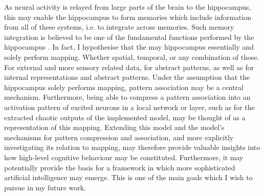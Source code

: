 
As neural activity is relayed from large parts of the brain to the hippocampus, this may enable the hippocampus to form memories which include information from all of these systems, i.e. to integrate across memories. Such memory integration is believed to be one of the fundamental functions performed by the hippocampus \citep{Rolls1998chpt1}.
In fact, I hypothesise that the may hippocampus essentially and solely perform mapping. Whether spatial, temporal, or any combination of those. For external and more sensory related data, for abstract patterns, as well as for internal representations and abstract patterns.
Under the assumption that the hippocampus solely performs mapping, pattern association may be a central mechanism. Furthermore, being able to compress a pattern association into an activation pattern of excited neurons in a local network or layer, such as for the extracted chaotic outputs of the implemented model, may be thought of as a representation of this mapping.
Extending this model and the model's mechanisms for pattern compression and association, and more explicitly investigating its relation to mapping, may therefore provide valuable insights into how high-level cognitive behaviour may be constituted. Furthermore, it may potentially provide the basis for a framework in which more sophisticated artificial intelligence may emerge. This is one of the main goals which I wish to pursue in my future work.

